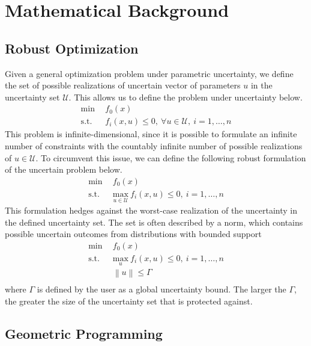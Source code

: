 \section{Mathematical Background}

\subsection{Robust Optimization}

Given a general optimization problem under parametric uncertainty, we define the set of possible
realizations of uncertain vector of parameters $u$ in the uncertainty set $\mathcal{U}$. This
allows us to define the problem under uncertainty below.
\begin{align*}
    \text{min} &~~f_0(x) \\
    \text{s.t.}     &~~f_i(x,u) \leq 0,~\forall u \in \mathcal{U},~i = 1,\ldots,n
\end{align*}
This problem is infinite-dimensional, since it is possible to formulate an infinite number of constraints
with the countably infinite number of possible realizations of $u \in \mathcal{U}$. To circumvent this issue,
we can define the following robust formulation of the uncertain problem below.
\begin{align*}
    \text{min} &~~f_0(x) \\
    \text{s.t.}     &~~\underset{u \in \mathcal{U}}{\text{max}}~f_i(x,u) \leq 0,~i = 1,\ldots,n
\end{align*}
This formulation hedges against the worst-case realization of the uncertainty in the defined uncertainty
set. The set is often described by a norm, which contains possible uncertain outcomes from distributions with
bounded support
\begin{equation}
    \begin{split}
        \text{min} &~~f_0(x) \\
    \text{s.t.}     &~~\underset{u}{\text{max}}~f_i(x,u) \leq 0,~i = 1,\ldots,n \\
                    &~~\left\lVert u \right\rVert \leq \Gamma \\
        \end{split}
    \label{eq:normform}
\end{equation}
where $\Gamma$ is defined by the user as a global uncertainty bound. The larger the $\Gamma$,
the greater the size of the uncertainty set that is protected against.

\subsection{Geometric Programming}

